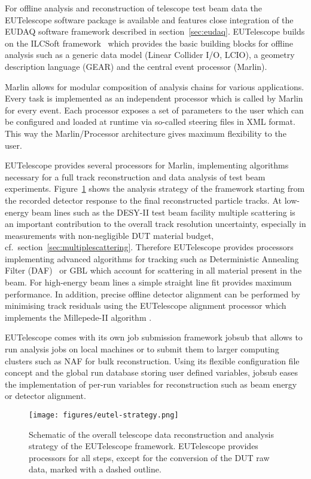 

For offline analysis and reconstruction of telescope test beam data the EUTelescope software package \cite{ref:eutelwebsite} is available and features close integration of the EUDAQ software framework described in section~\ref{sec:eudaq}.
EUTelescope builds on the ILCSoft framework~\cite{ref:eudetmemo_2009_12} which provides the basic building blocks for offline analysis such as a generic data model (Linear Collider I/O, LCIO),
a geometry description language (GEAR) and the central event processor (Marlin).

Marlin allows for modular composition of analysis chains for various applications. Every task is implemented as an independent processor which is called by Marlin for every event. 
Each processor exposes a set of parameters to the user which can be configured and loaded at runtime via so-called steering files in XML format.
This way the Marlin/Processor architecture gives maximum flexibility to the user.

EUTelescope provides several processors for Marlin, implementing algorithms necessary for a full track reconstruction and data analysis of test beam experiments. 
Figure~\ref{fig:offline:strategy} shows the analysis strategy of the framework starting from the recorded detector response to the final reconstructed particle tracks. 
At low-energy beam lines such as the DESY-II test beam facility multiple scattering is an important contribution to the overall track resolution uncertainty, especially in measurements with non-negligible DUT material budget, cf.\ section~\ref{sec:multiplescattering}.
Therefore EUTelescope provides processors implementing advanced algorithms for tracking such as Deterministic Annealing Filter (DAF)~\cite{ref:daffitter} or GBL which account for scattering in all material present in the beam.
For high-energy beam lines a simple straight line fit provides maximum performance.
In addition, precise offline detector alignment can be performed by minimising track residuals using the EUTelescope alignment processor which implements the Millepede-II algorithm \cite{Blobel-2006}.

EUTelescope comes with its own job submission framework jobsub that allows to run analysis jobs on local machines or to submit them to larger computing clusters such as NAF for bulk reconstruction.
Using its flexible configuration file concept and the global run database storing user defined variables, jobsub eases the implementation of per-run variables for reconstruction such as beam energy or detector alignment.

\begin{figure}[tbp]
\center
\texttt{[image: figures/eutel-strategy.png]}
\caption[The EUTelescope data analysis strategy]{Schematic of the overall telescope data reconstruction and analysis strategy of the EUTelescope framework.
EUTelescope provides processors for all steps, except for the conversion of the DUT raw data, marked with a dashed outline.}
\label{fig:offline:strategy}
\end{figure}


